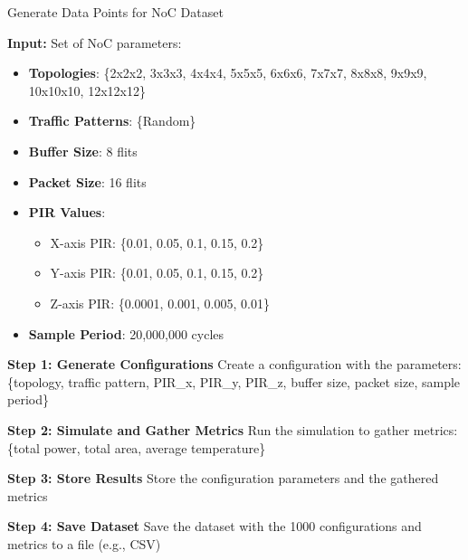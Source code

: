 \documentclass[conference]{IEEEtran}
\begin{document}
\begin{algorithm}[h]
\caption{Generate Data Points for NoC Dataset}
\label{algo}
\begin{algorithmic}[1]
    \State \textbf{Input:} Set of NoC parameters:
        \begin{itemize}
            \item \textbf{Topologies}: \{2x2x2, 3x3x3, 4x4x4, 5x5x5, 6x6x6, 7x7x7, 8x8x8, 9x9x9, 10x10x10, 12x12x12\}
            \item \textbf{Traffic Patterns}: \{Random\}
            \item \textbf{Buffer Size}: 8 flits
            \item \textbf{Packet Size}: 16 flits
            \item \textbf{PIR Values}:
                \begin{itemize}
                    \item X-axis PIR: \{0.01, 0.05, 0.1, 0.15, 0.2\}
                    \item Y-axis PIR: \{0.01, 0.05, 0.1, 0.15, 0.2\}
                    \item Z-axis PIR: \{0.0001, 0.001, 0.005, 0.01\}
                \end{itemize}
            \item \textbf{Sample Period}: 20,000,000 cycles
        \end{itemize}
        
    \State \textbf{Step 1: Generate Configurations}
                        \State Create a configuration with the parameters: \{topology, traffic pattern, PIR\_x, PIR\_y, PIR\_z, buffer size, packet size, sample period\}
                    \EndFor
                \EndFor
            \EndFor
        \EndFor
    \EndFor
    
    \State \textbf{Step 2: Simulate and Gather Metrics}
        \State Run the simulation to gather metrics: \{total power, total area, average temperature\}
    \EndFor
    
    \State \textbf{Step 3: Store Results}
        \State Store the configuration parameters and the gathered metrics
    \EndFor
    
    \State \textbf{Step 4: Save Dataset}
    \State Save the dataset with the 1000 configurations and metrics to a file (e.g., CSV)
    
\end{algorithmic}
\end{algorithm}
\end{document}
